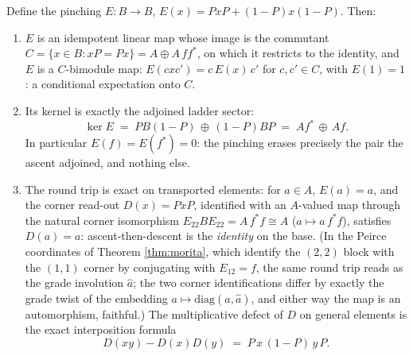 \begin{proposition}\label{prop:pinching}
Define the pinching $E : B \to B$, $E(x) = PxP + (1-P)x(1-P)$. Then:
\begin{enumerate}
\item $E$ is an idempotent linear map whose image is the commutant $C = \{x \in B : xP = Px\} = A \oplus A\,ff^*$, on which it restricts to the identity, and $E$ is a $C$-bimodule map: $E(cxc') = c\,E(x)\,c'$ for $c, c' \in C$, with $E(1) = 1$: a conditional expectation onto $C$.
\item Its kernel is exactly the adjoined ladder sector:
\[
\ker E \;=\; PB(1-P) \,\oplus\, (1-P)BP \;=\; A f^* \,\oplus\, A f .
\]
In particular $E(f) = E(f^*) = 0$: the pinching erases precisely the pair the ascent adjoined, and nothing else.
\item The round trip is exact on transported elements: for $a \in A$, $E(a) = a$, and the corner read-out $D(x) = PxP$, identified with an $A$-valued map through the natural corner isomorphism $E_{22}BE_{22} = A\,f^*f \cong A$ ($a \mapsto a\,f^*f$), satisfies $D(a) = a$: ascent-then-descent is the \emph{identity} on the base. (In the Peirce coordinates of Theorem \ref{thm:morita}, which identify the $(2,2)$ block with the $(1,1)$ corner by conjugating with $E_{12} = f$, the same round trip reads as the grade involution $\hat{a}$; the two corner identifications differ by exactly the grade twist of the embedding $a \mapsto \mathrm{diag}(a,\hat a)$, and either way the map is an automorphism, faithful.) The multiplicative defect of $D$ on general elements is the exact interposition formula
\[
D(xy) - D(x)D(y) \;=\; P\,x\,(1-P)\,y\,P .
\]
\end{enumerate}
\end{proposition}

